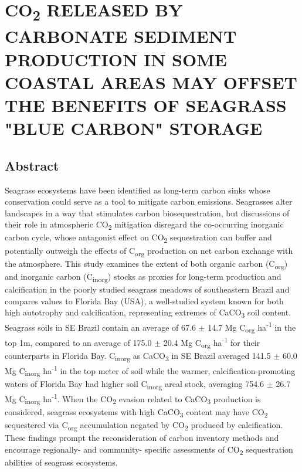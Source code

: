 \chapter{CO\textsubscript{2} RELEASED BY CARBONATE SEDIMENT PRODUCTION IN SOME COASTAL AREAS MAY OFFSET THE BENEFITS OF SEAGRASS "BLUE CARBON" STORAGE
}		\label{another chapter}

\section{Abstract}

Seagrass ecosystems have been identified as long-term carbon sinks whose conservation could serve as a tool to mitigate carbon emissions. Seagrasses alter landscapes in a way that stimulates carbon biosequestration, but discussions of their role in atmospheric CO\textsubscript{2} mitigation disregard the co-occurring inorganic carbon cycle, whose antagonist effect on CO\textsubscript{2} sequestration can buffer and potentially outweigh the effects of C\textsubscript{org} production on net carbon exchange with the atmosphere. This study examines the extent of both organic carbon (C\textsubscript{org}) and inorganic carbon (C\textsubscript{inorg}) stocks as proxies for long-term production and calcification in the poorly studied seagrass meadows of southeastern Brazil and compares values to Florida Bay (USA), a well-studied system known for both high autotrophy and calcification, representing extremes of CaCO\textsubscript{3} soil content. Seagrass soils in SE Brazil contain an average of 67.6 $\pm$ 14.7 Mg C\textsubscript{org} ha\textsuperscript{-1} in the top 1m, compared to an average of 175.0 $\pm$ 20.4 Mg C\textsubscript{org} ha\textsuperscript{-1} for their counterparts in Florida Bay. C\textsubscript{inorg} as CaCO\textsubscript{3} in SE Brazil averaged 141.5 $\pm$ 60.0 Mg C\textsubscript{inorg} ha\textsuperscript{-1} in the top meter of soil while the warmer, calcification­-promoting waters of Florida Bay had higher soil C\textsubscript{inorg} areal stock, averaging 754.6 $\pm$ 26.7 Mg C\textsubscript{inorg} ha\textsuperscript{-1}. When the CO\textsubscript{2} evasion related to CaCO\textsubscript{3} production is considered, seagrass ecosystems with high CaCO\textsubscript{3} content may have CO\textsubscript{2} sequestered via C\textsubscript{org} accumulation negated by CO\textsubscript{2} produced by calcification. These findings prompt the reconsideration of carbon inventory methods and encourage regionally- and community- specific assessments of CO\textsubscript{2} sequestration abilities of seagrass ecosystems.


